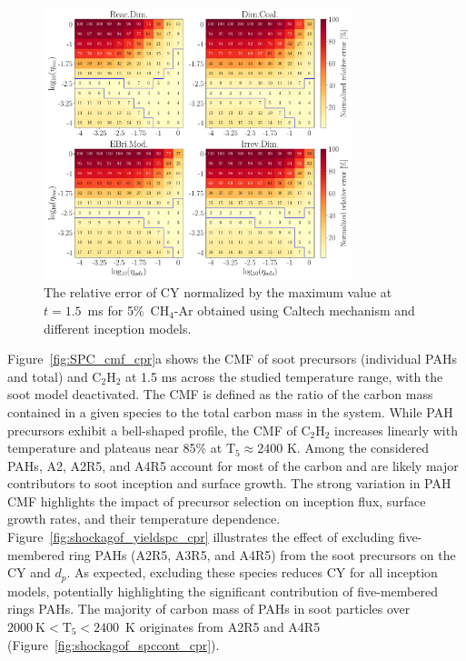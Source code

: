 \begin{figure}[H]
	\centering
	\includegraphics[width=0.8\textwidth]{Figures/Results/Shocktube/Agafonov2016_cpr/5CH4_norm_yield_error_all.pdf}
	\caption{The relative error of CY normalized by the maximum value at $t=1.5$~ms for 5\%~$\mathrm{CH_4}$-Ar obtained using Caltech mechanism and different inception models.}
	\label{fig:shockagof_yielderror_cpr} 
\end{figure}

Figure~\ref{fig:SPC_cmf_cpr}a shows the CMF of soot precursors (individual PAHs and total) and $\mathrm{C_2H_2}$ at 1.5 ms across the studied temperature range, with the soot model deactivated. The CMF is defined as the ratio of the carbon mass contained in a given species to the total carbon mass in the system. While PAH precursors exhibit a bell-shaped profile, the CMF of $\mathrm{C_2H_2}$ increases linearly with temperature and plateaus near 85\% at $\mathrm{T_5} \approx 2400$ K. Among the considered PAHs, A2, A2R5, and A4R5 account for most of the carbon and are likely major contributors to soot inception and surface growth. The strong variation in PAH CMF highlights the impact of precursor selection on inception flux, surface growth rates, and their temperature dependence. Figure~\ref{fig:shockagof_yieldspc_cpr} illustrates the effect of excluding five-membered ring PAHs (A2R5, A3R5, and A4R5) from the soot precursors on the CY and $d_p$. As expected, excluding these species reduces CY for all inception models, potentially highlighting the significant contribution of five-membered rings PAHs. The majority of carbon mass of PAHs in soot particles over $2000~\mathrm{K}<\mathrm{T_5}<2400$~K originates from A2R5 and A4R5 (Figure~\ref{fig:shockagof_spccont_cpr}).

